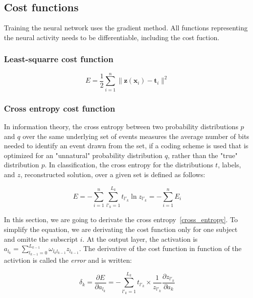 \documentclass[final, paper=letter,5p,times,twocolumn]{elsarticle}
\begin{document}
\subsection{Cost functions}

Training the neural network uses the gradient method. All functions representing the neural activity needs to be differentiable, including the cost fuction.

\subsubsection{Least-squarre cost function}

\begin{equation}
  E = \frac{1}{2} \sum_{i = 1}^{n} \| \bm{z}(\bm{x}_{i}) - \bm{t}_{i} \|^{2}
  \label{least_squarre}
\end{equation}

\subsubsection{Cross entropy cost function}

In information theory, the cross entropy between two probability distributions $p$ and $q$ over the same underlying set of events measures the average number of bits needed to identify an event drawn from the set, if a coding scheme is used that is optimized for an "unnatural" probability distribution $q$, rather than the "true" distribution $p$. In classification, the cross entropy for the distributions $t$, labels, and $z$, reconstructed solution, over a given set is defined as follows:

\begin{equation}
  E = - \sum_{i = 1}^{n}\sum_{l'_{k} = 1}^{L_{k}} t_{l'_{k}} \ln z_{l'_{k}} =  - \sum_{i = 1}^{n} E_{i}
  \label{cross_entropy}
\end{equation}

In this section, we are going to derivate the cross entropy~\ref{cross_entropy}. To simplify the equation, we are derivating the cost function only for one subject and omitte the subscript $i$. At the output layer, the activation is $a_{l_{k}} = \sum_{l_{k-1} = 0}^{L_{k-1}} \omega_{l_{k}l_{k-1}} z_{l_{k-1}}$. The derivative of the cost function in function of the activtion is called the {\it error} and is written:

\begin{equation}
  \delta_{k} = \frac{\partial E}{\partial a_{l_{k}}} = - \sum_{l'_{k} = 1}^{L_{k}} t_{l'_{k}} \times \frac{1}{z_{l'_{k}}} \frac{\partial z_{l'_{k}}}{\partial a_{k}}
  \label{cost_function_error}
\end{equation}
\end{document}

